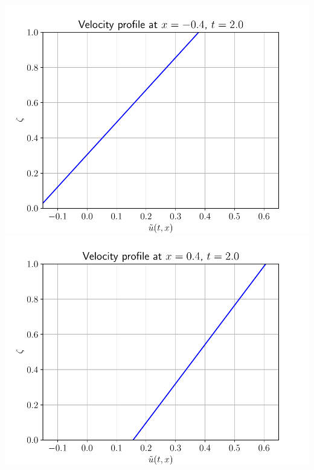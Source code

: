 \documentclass[10pt]{beamer}
\begin{document}
\begin{frame}
        \includegraphics[scale=0.2]{Figures/velocity_profile_-0_4_10.pdf}
        \includegraphics[scale=0.2]{Figures/velocity_profile_0_4_10.pdf}
      \end{frame}
\end{document}

